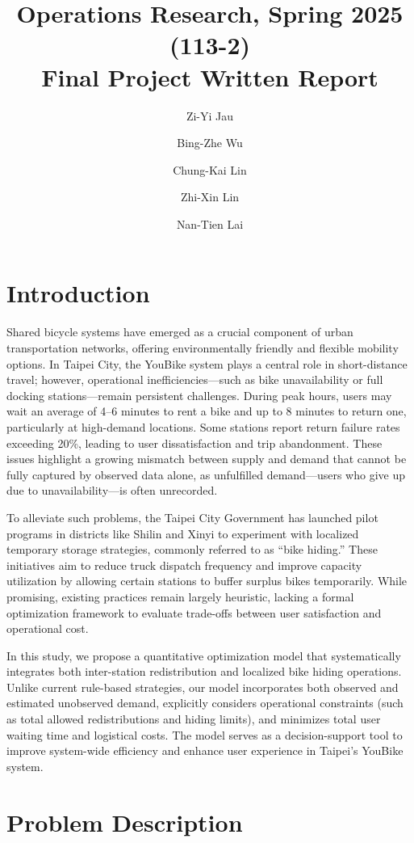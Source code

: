 \documentclass[11pt,a4paper]{article}
\title{Operations Research, Spring 2025 (113-2) \\ Final Project Written Report}
\author{Zi-Yi Jau} %
\author{Bing-Zhe Wu} %
\author{Chung-Kai Lin} %
\author{Zhi-Xin Lin} %
\author{Nan-Tien Lai} %
\affil{Department of Information Management, National Taiwan University}
\begin{document}
\maketitle

\section{Introduction}

Shared bicycle systems have emerged as a crucial component of urban transportation networks, offering environmentally friendly and flexible mobility options. In Taipei City, the YouBike system plays a central role in short-distance travel; however, operational inefficiencies—such as bike unavailability or full docking stations—remain persistent challenges. During peak hours, users may wait an average of 4–6 minutes to rent a bike and up to 8 minutes to return one, particularly at high-demand locations. Some stations report return failure rates exceeding 20\%, leading to user dissatisfaction and trip abandonment. These issues highlight a growing mismatch between supply and demand that cannot be fully captured by observed data alone, as unfulfilled demand—users who give up due to unavailability—is often unrecorded.

To alleviate such problems, the Taipei City Government has launched pilot programs in districts like Shilin and Xinyi to experiment with localized temporary storage strategies, commonly referred to as “bike hiding.” These initiatives aim to reduce truck dispatch frequency and improve capacity utilization by allowing certain stations to buffer surplus bikes temporarily. While promising, existing practices remain largely heuristic, lacking a formal optimization framework to evaluate trade-offs between user satisfaction and operational cost.

In this study, we propose a quantitative optimization model that systematically integrates both inter-station redistribution and localized bike hiding operations. Unlike current rule-based strategies, our model incorporates both observed and estimated unobserved demand, explicitly considers operational constraints (such as total allowed redistributions and hiding limits), and minimizes total user waiting time and logistical costs. The model serves as a decision-support tool to improve system-wide efficiency and enhance user experience in Taipei’s YouBike system.




\section{Problem Description}
\end{document}
